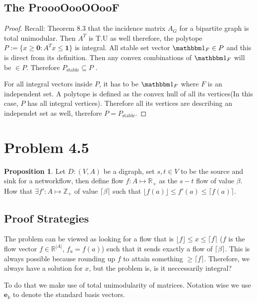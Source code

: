 \documentclass[]{article}
\theoremstyle{definition}
\newtheorem{prop}{Proposition}[section]  %
\begin{document}
    \subsection{The ProooOooOOooF}
    \begin{proof}
        Recall: Theorem 8.3 that the incidence matrix $A_G$ for a bipartite graph is total unimodular. Then $A^T$ is T.U as well therefore, the polytope $P:=\{x\ge \mathbf 0: A^Tx\le \mathbf 1\}$ is integral. All stable set vector $\mathbbm 1_F \in P$ and this is direct from its definition. Then any convex combinations of $\mathbbm 1_F$ will be $\in P$. Therefore $P_{\text{stable}}\subseteq P$ . 
        \par
        For all integral vectors inside $P$, it has to be $\mathbbm 1_F$ where $F$ is an independent set. A polytope is defined as the convex hull of all its vertices(In this case, $P$ has all integral vertices). Therefore all its vertices are describing an independet set as well, therefore $P = P_{\text{stable}}$. 
    \end{proof}

\section{Problem 4.5}
    \begin{prop}
        Let $D:(V, A)$ be a digraph, set $s, t\in V$ to be the source and sink for a networkflow, then define flow $f: A\mapsto \mathbb R_+$ as the $s-t$ flow of value $\beta$. How that $\exists f': A\mapsto \mathbb Z_+$ of value $\lceil \beta\rceil$ such that $\lfloor f(a)\rfloor \le f'(a) \le \lceil f(a)\rceil$. 
    \end{prop}
    \subsection{Proof Strategies}
        The problem can be viewed as looking for a flow that is $\lfloor f\rfloor\le x \le \lceil f\rceil$ ($f$ is the flow vector $f\in \mathbb R^{|A|}$, $f_a = f(a)$) such that it sends exactly a flow of $\lceil \beta \rceil$. This is always possible because rounding up $f$ to attain something $\ge \lceil f\rceil$. Therefore, we always have a solution for $x$, but the problem is, is it neccessarily integral? 
        \par
        To do that we make use of total unimodularity of matrices. Notation wise we use $\mathbf e_k$ to denote the standard basis vectors. 
\end{document}
